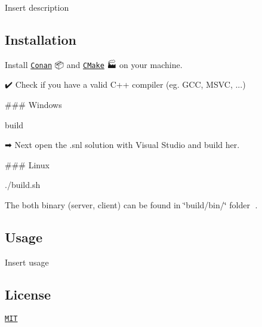 Insert description

\subsection*{Installation}

Install \href{https://conan.io/downloads.html}{\tt Conan} 📦 and \href{https://cmake.org/download/}{\tt C\+Make} 🏭 on your machine.

✔️ Check if you have a valid C++ compiler (eg. G\+CC, M\+S\+VC, ...)

\#\#\# Windows 
\begin{DoxyCode}
build
\end{DoxyCode}
 ➡ Next open the .snl solution with Visual Studio and build her.

\#\#\# Linux 
\begin{DoxyCode}
./build.sh
\end{DoxyCode}


The both binary (server, client) can be found in \char`\"{}build/bin/\char`\"{} folder 📁.

\subsection*{Usage}

Insert usage

\subsection*{License}

\href{https://choosealicense.com/licenses/mit/}{\tt M\+IT} 